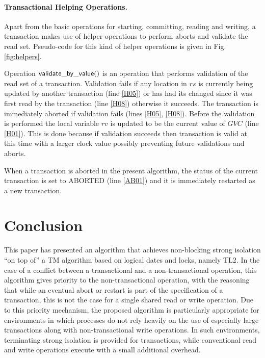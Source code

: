 \paragraph{Transactional Helping Operations.} 
Apart from the basic operations for starting, committing, 
reading and writing, a transaction makes use of helper 
operations to perform aborts and validate the read set.
 Pseudo-code for this kind of helper operations 
is given in Fig. \ref{fig:helpers}.

Operation ${\sf validate\_by\_value()}$ is an operation that performs 
validation of the read set of a transaction. 
Validation fails 
if any location in $\mathit{rs}$ is 
currently being updated by another transaction (line \ref{H05})
or has had its changed since it was first read by the transaction (line \ref{H08})
otherwise it succeeds.
The transaction is immediately aborted if validation fails (lines \ref{H05}, \ref{H08}).
Before the validation is performed the local variable $\mathit{rv}$ is updated
to be the current value of $\mathit{GVC}$ (line \ref{H01}).
This is done because if validation succeeds then transaction is valid at this time
with a larger
clock value possibly preventing future validations and aborts.

When a transaction is aborted in the present algorithm, 
the status of the current transaction is set to ABORTED (line \ref{AB01}) and
it is immediately restarted as a new transaction.


\section{Conclusion}
\label{sec:conclusions}
This paper has presented an algorithm that achieves non-blocking strong 
isolation  ``on top of'' a TM algorithm based on logical dates and locks, 
namely  TL2. 
In the case of a conflict between a transactional and a non-transactional
operation, this algorithm gives priority to 
the non-transactional operation, 
with the reasoning that while an eventual abort or restart is part of the 
specification of a transaction,
this is not the case for a single shared read or write operation. 
Due to this priority mechanism, 
the proposed algorithm is   particularly appropriate  for environments 
in which processes do not rely heavily
on the use of especially large transactions along with non-transactional write operations.
In such environments, terminating strong isolation is  provided for transactions, 
while conventional read and write operations execute with a small additional overhead.


